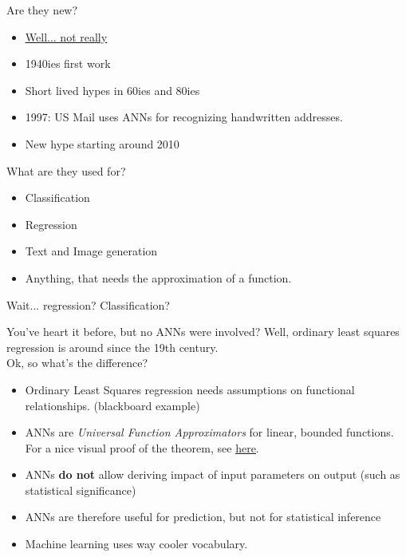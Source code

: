 \documentclass[color=usenames,dvipsnames]{beamer}
\begin{document}
\begin{frame}{Are they new?} 

\begin{itemize}
	\item \href{https://scholar.google.at/citations?user=tvUH3WMAAAAJ&hl=de}{\underline{Well... not really}}
   \item 1940ies first work
   \item Short lived hypes in 60ies and 80ies
   \item 1997: US Mail uses ANNs for recognizing handwritten addresses.
   \item New hype starting around 2010
\end{itemize}

\end{frame}


\begin{frame}{What are they used for?} 

\begin{itemize}
	\item Classification
	\item Regression
	\item Text and Image generation
	\item Anything, that needs the approximation of a function.
\end{itemize}

\end{frame}

\begin{frame}{Wait... regression? Classification?} 

You've heart it before, but no ANNs were involved? Well, ordinary least squares regression is around since the 19th century.\\

Ok, so what's the difference?\\

\begin{itemize}
	\item Ordinary Least Squares regression needs assumptions on functional relationships. (blackboard example)
	\item ANNs are \textit{Universal Function Approximators} for linear, bounded functions. For a nice visual proof of the theorem, see \href{http://neuralnetworksanddeeplearning.com/chap4.html} {\underline{here}}.
	\item ANNs \textbf{do not} allow deriving impact of input parameters on output (such as statistical significance)
	\item ANNs are therefore useful for prediction, but not for statistical inference
	\item Machine learning uses way cooler vocabulary. 
\end{itemize} 

\end{frame}
\end{document}
